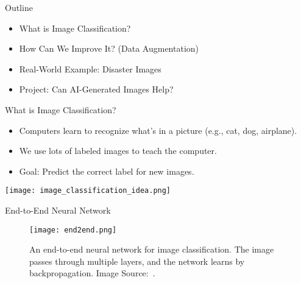 
\begin{frame}{Outline}
  \begin{itemize}
    \item What is Image Classification?
    \item How Can We Improve It? (Data Augmentation)
    \item Real-World Example: Disaster Images
    \item Project: Can AI-Generated Images Help?
  \end{itemize}
\end{frame}



\begin{frame}{What is Image Classification?}
  \begin{itemize}
    \item Computers learn to recognize what’s in a picture (e.g., cat, dog, airplane).
    \item We use lots of labeled images to teach the computer.
    \item Goal: Predict the correct label for new images.
  \end{itemize}
  \centering
  \texttt{[image: image\_classification\_idea.png]}
\end{frame}

\begin{refsection}
\begin{frame}{End-to-End Neural Network}
  \begin{figure}
    \centering
    \texttt{[image: end2end.png]}
    \caption[]{\scriptsize An end-to-end neural network for image classification. The image passes through multiple layers, and the network learns by backpropagation. Image Source:~\cite{he2025endtoend}.}
  \end{figure}
  \bottomleftrefs
\end{frame}
\end{refsection}

